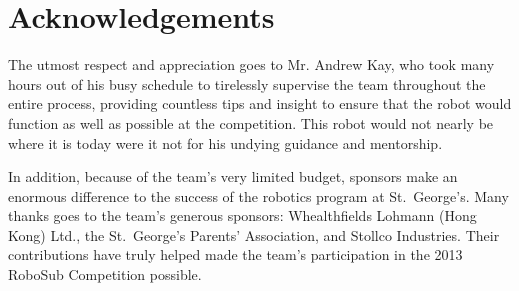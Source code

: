 \documentclass[12pt, letterpaper, twocolumn, titlepage]{article}
\begin{document}
\section{Acknowledgements}

The utmost respect and appreciation goes to Mr. Andrew Kay, who took many hours out of his busy schedule to tirelessly supervise the team throughout the entire process, providing countless tips and insight to ensure that the robot would function as well as possible at the competition. This robot would not nearly be where it is today were it not for his undying guidance and mentorship.

In addition, because of the team's very limited budget, sponsors make an enormous difference to the success of the robotics program at St.~George's. Many thanks goes to the team's generous sponsors: Whealthfields Lohmann (Hong Kong) Ltd., the St.~George's Parents' Association, and Stollco Industries. Their contributions have truly helped made the team's participation in the 2013 RoboSub Competition possible.
\end{document}
